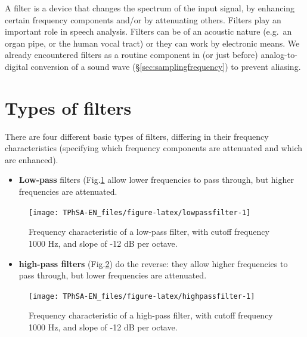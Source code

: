 \documentclass[
]{book}
\providecommand{\tightlist}{%
  \setlength{\itemsep}{0pt}\setlength{\parskip}{0pt}}
\begin{document}
A filter is a device that changes the spectrum of the input signal, by enhancing certain frequency components and/or by attenuating others. Filters play an important role in speech analysis. Filters can be of an acoustic nature (e.g.~an organ pipe, or the human vocal tract) or they can work by electronic means. We already encountered filters as a routine component in (or just before) analog-to-digital conversion of a sound wave (§\ref{sec:samplingfrequency}) to prevent aliasing.

\section{Types of filters}\label{sec:typesoffilters}

There are four different basic types of filters, differing in their frequency characteristics (specifying which frequency components are attenuated and which are enhanced).

\begin{itemize}
\tightlist
\item
  \textbf{Low-pass} filters (Fig.\ref{fig:lowpassfilter} allow lower frequencies to pass through, but higher frequencies are attenuated.
\end{itemize}

\begin{figure}

{\centering \texttt{[image: TPhSA-EN\_files/figure-latex/lowpassfilter-1]} 

}

\caption{Frequency characteristic of a low-pass filter, with cutoff frequency 1000 Hz, and slope of -12 dB per octave.}\label{fig:lowpassfilter}
\end{figure}

\begin{itemize}
\tightlist
\item
  \textbf{high-pass filters} (Fig.\ref{fig:highpassfilter}) do the reverse: they allow higher frequencies to pass through, but lower frequencies are attenuated.
\end{itemize}

\begin{figure}

{\centering \texttt{[image: TPhSA-EN\_files/figure-latex/highpassfilter-1]} 

}

\caption{Frequency characteristic of a high-pass filter, with cutoff frequency 1000 Hz, and slope of -12 dB per octave.}\label{fig:highpassfilter}
\end{figure}
\end{document}

